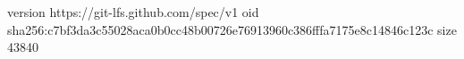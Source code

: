 version https://git-lfs.github.com/spec/v1
oid sha256:c7bf3da3c55028aca0b0cc48b00726e76913960c386fffa7175e8c14846c123c
size 43840
